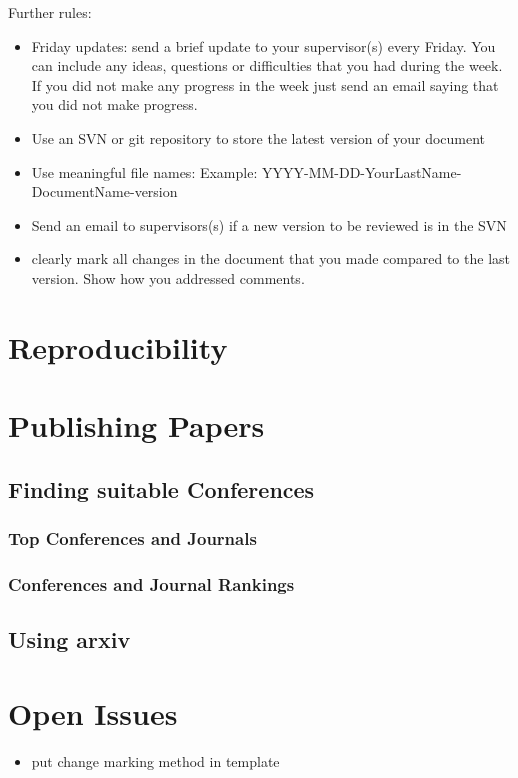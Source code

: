 Further rules:
\begin{itemize}
	\item Friday updates: send a brief update to your supervisor(s) every Friday. You can include any ideas, questions or difficulties that you had during the week. If you did not make any progress in the week just send an email saying that you did not make progress.
	\item Use an SVN or git repository to store the latest version of your document
	\item Use meaningful file names: Example: YYYY-MM-DD-YourLastName-DocumentName-version
	\item Send an email to supervisors(s) if a new version to be reviewed is in the SVN
	\item clearly mark all changes in the document that you made compared to the last version. Show how you addressed comments.
\end{itemize}

\section{Reproducibility}




\section{Publishing Papers}

\subsection{Finding suitable Conferences}
\subsubsection{Top Conferences and Journals}

\subsubsection{Conferences and Journal Rankings}


\subsection{Using arxiv}

\section{Open Issues}
\begin{itemize}
	\item put change marking method in template
\end{itemize}


